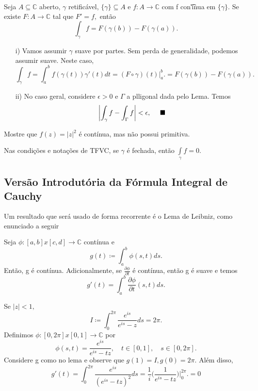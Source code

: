 \documentclass[ComplexAnalysis/complex.tex]{subfiles}
\begin{document}
\begin{theorem*}
	Seja $A\subseteq{\mathbb{C}}$ aberto, $\gamma$ retificável, $\{\gamma\}\subseteq{A}\text{ e }f:A\rightarrow \mathbb{C} $ com f
	con\t'inua em $\{\gamma\} $. Se existe $F:A\rightarrow \mathbb{C}$ tal que $F' = f,$ então
	$$
		\int_{\gamma}^{}f = F(\gamma(b)) - F(\gamma(a)).
	$$
\end{theorem*}
\begin{proof*}
	\begin{itemize}
		\item[i)] Vamos assumir $\gamma$ suave por partes. Sem perda de generalidade, podemos assumir suave. Neste caso,
		      $$
			      \int_{\gamma}^{}f = \int_{a}^{b} f(\gamma(t))\gamma'(t)dt = (F\circ{\gamma})(t)\biggl|_a^b\biggr. = F(\gamma(b)) - F(\gamma(a)).
		      $$
		\item[ii)] No caso geral, considere $\epsilon > 0$ e $\Gamma$ a plligonal dada pelo Lema. Temos
		      $$
			      \biggl|\int_{\gamma}^{}f - \int_{\Gamma}^{}f\biggr| < \epsilon, \quad\text{ $\blacksquare$}
		      $$
	\end{itemize}
\end{proof*}
\begin{exer*}
	Mostre que $f(z) = |z|^2$ é contínua, mas não possui primitiva.
\end{exer*}
\begin{crl*}
	Nas condições e notações de TFVC, se $\gamma$ é fechada, então $\int\limits_{\gamma}f = 0.$
\end{crl*}

\subsection{Versão Introdutória da Fórmula Integral de Cauchy}
Um resultado que será usado de forma recorrente é o Lema de Leibniz, como enunciado a seguir
\begin{lmm*}
	Seja $\phi:[a, b]x[c, d]\rightarrow \mathbb{C}$ contínua e
	$$
		g(t)\coloneqq  \int_{a}^{b}\phi(s, t)ds.
	$$
	Então, g é contínua. Adicionalmente, se $\frac{\partial{\phi}}{\partial{t}}$ é contínua, então g é suave e temos
	$$
		g'(t) = \int_{a}^{b}\frac{\partial{\phi}}{\partial{t}}(s, t)ds.
	$$
\end{lmm*}
\begin{example}
	Se $|z| < 1,$
	$$
		I\coloneqq  \int_{0}^{2\pi}\frac{e^{is}}{e^{is}-z}ds = 2\pi.
	$$
	Definimos $\phi:[0, 2\pi]x[0, 1]\rightarrow \mathbb{C}$ por
	$$
		\phi(s, t) = \frac{e^{is}}{e^{is} - tz}, \quad t\in[0, 1], \quad s\in[0, 2\pi].
	$$
	Considere g como no lema e observe que $g(1) = I, g(0) = 2\pi.$ Além disso,
	$$
		g'(t) = \int_{0}^{2\pi}\frac{e^{is}}{(e^{is} - tz)^{2}}ds = \frac{1}{i}\biggl(\frac{1}{e^{is}-tz}\biggr)\biggl|_0^{2\pi}\biggr. = 0
	$$
\end{example}
\end{document}
